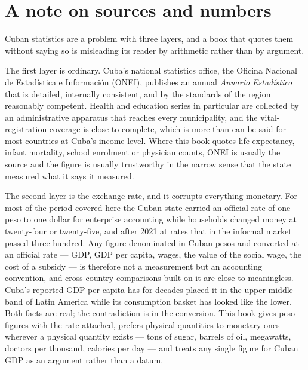 \chapter*{A note on sources and numbers}

Cuban statistics are a problem with three layers, and a book that quotes them
without saying so is misleading its reader by arithmetic rather than by
argument.

The first layer is ordinary. Cuba's national statistics office, the Oficina
Nacional de Estad\'istica e Informaci\'on (ONEI), publishes an annual
\emph{Anuario Estad\'istico} that is detailed, internally consistent, and by
the standards of the region reasonably competent. Health and education series
in particular are collected by an administrative apparatus that reaches every
municipality, and the vital-registration coverage is close to complete, which
is more than can be said for most countries at Cuba's income level. Where this
book quotes life expectancy, infant mortality, school enrolment or physician
counts, ONEI is usually the source and the figure is usually trustworthy in the
narrow sense that the state measured what it says it measured.

The second layer is the exchange rate, and it corrupts everything monetary. For
most of the period covered here the Cuban state carried an official rate of one
peso to one dollar for enterprise accounting while households changed money at
twenty-four or twenty-five, and after 2021 at rates that in the informal market
passed three hundred. Any figure denominated in Cuban pesos and converted at an
official rate --- GDP, GDP per capita, wages, the value of the social wage, the
cost of a subsidy --- is therefore not a measurement but an accounting
convention, and cross-country comparisons built on it are close to meaningless.
Cuba's reported GDP per capita has for decades placed it in the upper-middle
band of Latin America while its consumption basket has looked like the lower.
Both facts are real; the contradiction is in the conversion. This book gives
peso figures with the rate attached, prefers physical quantities to monetary
ones wherever a physical quantity exists --- tons of sugar, barrels of oil,
megawatts, doctors per thousand, calories per day --- and treats any single
figure for Cuban GDP as an argument rather than a datum.

